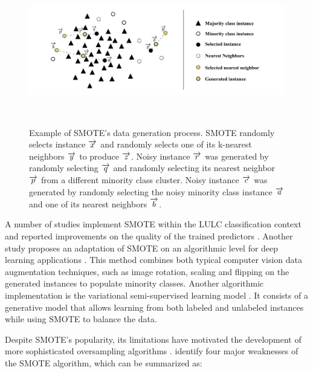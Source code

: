 \begin{figure}
	\centering
	\includegraphics[width=1\linewidth]{smote_example}
    \caption[Example of SMOTE's data generation process]{Example of SMOTE's
        data generation process. SMOTE randomly selects instance
        $\protect\overrightarrow{x}$ and randomly selects one of its k-nearest
        neighbors $\protect\overrightarrow{y}$ to produce
        $\protect\overrightarrow{z}$.  Noisy instance
        $\protect\overrightarrow{r}$ was generated by randomly selecting
        $\protect\overrightarrow{q}$ and randomly selecting its nearest
        neighbor $\protect\overrightarrow{p}$ from a different minority class
        cluster. Noisy instance $\protect\overrightarrow{c}$ was generated by
        randomly selecting the noisy minority class instance
        $\protect\overrightarrow{a}$ and one of its nearest neighbors
        $\protect\overrightarrow{b}$.
    }~\label{fig:smote_example}
\end{figure}

A number of studies implement SMOTE within the LULC classification context and
reported improvements on the quality of the trained predictors
\cite{Jozdani2019, Bogner2018}. Another study proposes an adaptation of SMOTE
on an algorithmic level for deep learning applications \cite{Zhu2020}. This
method combines both typical computer vision data augmentation techniques,
such as image rotation, scaling and flipping on the generated instances to
populate minority classes. Another algorithmic implementation is the
variational semi-supervised learning model \cite{Cenggoro2018}. It consists of
a generative model that allows learning from both labeled and unlabeled
instances while using SMOTE to balance the data.

Despite SMOTE's popularity, its limitations have motivated the development of
more sophisticated oversampling algorithms \cite{Douzas2019, Han2005, Ma2017,
Douzas2017, Douzas2018, HaiboHe2008}. \cite{Douzas2019} identify four major
weaknesses of the SMOTE algorithm, which can be summarized as:

